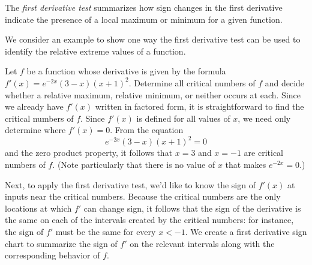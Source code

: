 The \emph{first derivative test}  summarizes how sign changes in the first derivative indicate the presence of a local maximum or minimum for a given function.

\vspace*{5pt}
\nin {}
\vspace*{1pt}

We consider an example to show one way the first derivative test can be used to identify the relative extreme values of a function.

\bex \label{Ex:f_from_f'}
Let $f$ be a function whose derivative is given by the formula $f'(x) = e^{-2x}(3-x)(x+1)^2$.  Determine all critical numbers of $f$ and decide whether a relative maximum, relative minimum, or neither occurs at each.
\eex
Since we already have $f'(x)$ written in factored form, it is straightforward to find the critical numbers of $f$.  Since $f'(x)$ is defined for all values of $x$, we need only determine where $f'(x) = 0$.  From the equation
$$e^{-2x}(3-x)(x+1)^2 = 0$$
and the zero product property, it follows that $x = 3$ and $x = -1$ are critical numbers of $f$.  (Note particularly that there is no value of $x$ that makes $e^{-2x} = 0$.)  

Next, to apply the first derivative test, we'd like to know the sign of $f'(x)$ at inputs near the critical numbers.  Because the critical numbers are the only locations at which $f'$ can change sign, it follows that the sign of the derivative is the same on each of the intervals created by the critical numbers:  for instance, the sign of $f'$ must be the same for every $x < -1$.  We create a first derivative sign chart to summarize the sign of $f'$ on the relevant intervals along with the corresponding behavior of $f$.

